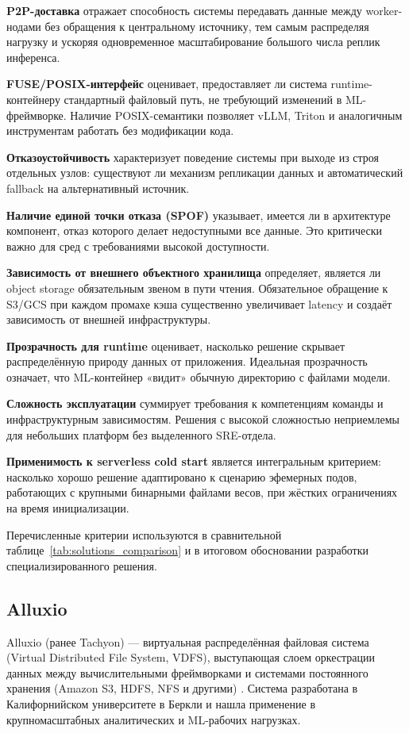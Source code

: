 \textbf{P2P-доставка} отражает способность системы передавать данные между worker-нодами без обращения к центральному источнику, тем самым распределяя нагрузку и ускоряя одновременное масштабирование большого числа реплик инференса.

\textbf{FUSE/POSIX-интерфейс} оценивает, предоставляет ли система runtime-контейнеру стандартный файловый путь, не требующий изменений в ML-фреймворке. Наличие POSIX-семантики позволяет vLLM, Triton и аналогичным инструментам работать без модификации кода.

\textbf{Отказоустойчивость} характеризует поведение системы при выходе из строя отдельных узлов: существуют ли механизм репликации данных и автоматический fallback на альтернативный источник.

\textbf{Наличие единой точки отказа (SPOF)} указывает, имеется ли в архитектуре компонент, отказ которого делает недоступными все данные. Это критически важно для сред с требованиями высокой доступности.

\textbf{Зависимость от внешнего объектного хранилища} определяет, является ли object storage обязательным звеном в пути чтения. Обязательное обращение к S3/GCS при каждом промахе кэша существенно увеличивает latency и создаёт зависимость от внешней инфраструктуры.

\textbf{Прозрачность для runtime} оценивает, насколько решение скрывает распределённую природу данных от приложения. Идеальная прозрачность означает, что ML-контейнер «видит» обычную директорию с файлами модели.

\textbf{Сложность эксплуатации} суммирует требования к компетенциям команды и инфраструктурным зависимостям. Решения с высокой сложностью неприемлемы для небольших платформ без выделенного SRE-отдела.

\textbf{Применимость к serverless cold start} является интегральным критерием: насколько хорошо решение адаптировано к сценарию эфемерных подов, работающих с крупными бинарными файлами весов, при жёстких ограничениях на время инициализации.

Перечисленные критерии используются в сравнительной таблице~\ref{tab:solutions_comparison} и в итоговом обосновании разработки специализированного решения.

\subsection{Alluxio}
\label{sec:alluxio}

Alluxio (ранее Tachyon) --- виртуальная распределённая файловая система (Virtual Distributed File System, VDFS), выступающая слоем оркестрации данных между вычислительными фреймворками и системами постоянного хранения (Amazon S3, HDFS, NFS и другими) \cite{alluxio_arch}. Система разработана в Калифорнийском университете в Беркли и нашла применение в крупномасштабных аналитических и ML-рабочих нагрузках.

